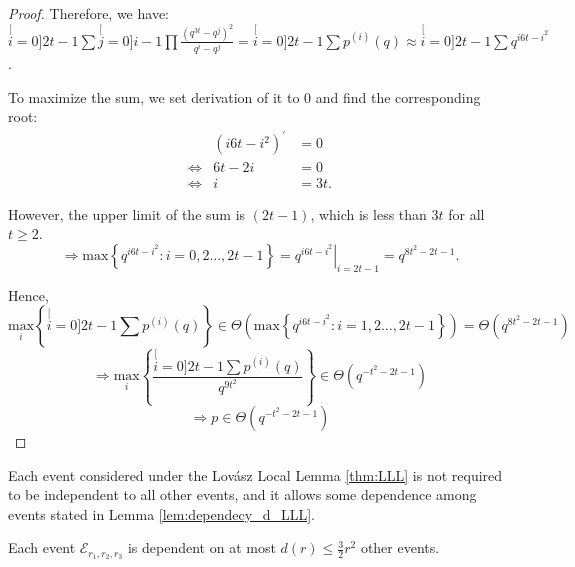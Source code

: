 \begin{proof}
Therefore, we have: $\stackrel[i=0]{2t-1}{\mathop{\sum}}\stackrel[j=0]{i-1}{\mathop{\prod}}\frac{\left(q^{3t}-q^{j}\right)^{2}}{q^{i}-q^{j}}=\stackrel[i=0]{2t-1}{\mathop{\sum}}p^{(i)}(q)\approx\stackrel[i=0]{2t-1}{\mathop{\sum}}q^{i6t-i^{2}}$.

To maximize the sum, we set derivation of it to 0 and find the corresponding
root: 
\begin{eqnarray*}
 & \left(i6t-i^{2}\right)^{'} & =0\\
\Leftrightarrow & 6t-2i & =0\\
\Leftrightarrow & i & =3t.
\end{eqnarray*}

However, the upper limit of the sum is $\left(2t-1\right)$, which
is less than $3t$ for all $t\geq2$.
\[
\Rightarrow\mathrm{max}\left\{ q^{i6t-i^{2}}:i=0,2\ldots,2t-1\right\} =\left.q^{i6t-i^{2}}\right|_{i=2t-1}=q^{8t^{2}-2t-1}.
\]

Hence,
\[
\underset{i}{\mathrm{max}}\left\{ \stackrel[i=0]{2t-1}{\mathop{\sum}}p^{(i)}(q)\right\} \in\Theta\left(\mathrm{max}\left\{ q^{i6t-i^{2}}:i=1,2\ldots,2t-1\right\} \right)=\Theta\left(q^{8t^{2}-2t-1}\right)
\]
\[
\Rightarrow\underset{i}{\mathrm{max}}\left\{ \frac{\stackrel[i=0]{2t-1}{\mathop{\sum}}p^{(i)}(q)}{q^{9t^{2}}}\right\} \in\Theta\left(q^{-t^{2}-2t-1}\right)
\]
\[
\Rightarrow p\in\Theta\left(q^{-t^{2}-2t-1}\right)
\]
\end{proof}
Each event considered under the Lov\'asz Local Lemma \ref{thm:LLL}
is not required to be independent to all other events, and it allows
some dependence among events stated in Lemma \ref{lem:dependecy_d_LLL}.
\begin{lem}
Each event $\mathcal{E}_{r_{1},r_{2},r_{3}}$ is dependent on at most
$d\left(r\right)\leq\frac{3}{2}r^{2}$ other events. \label{lem:dependecy_d_LLL}
\end{lem}
